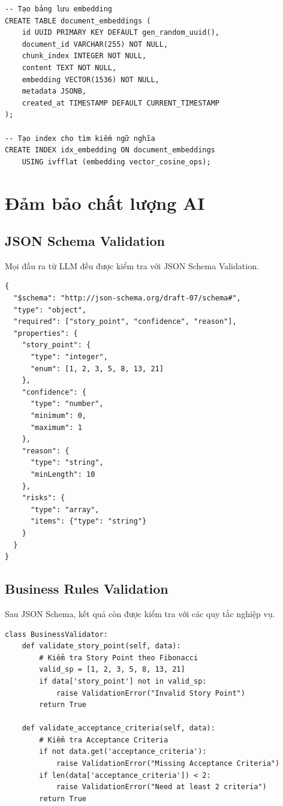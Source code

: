 \documentclass[12pt,a4paper]{report}
\begin{document}
\begin{verbatim}
-- Tạo bảng lưu embedding
CREATE TABLE document_embeddings (
    id UUID PRIMARY KEY DEFAULT gen_random_uuid(),
    document_id VARCHAR(255) NOT NULL,
    chunk_index INTEGER NOT NULL,
    content TEXT NOT NULL,
    embedding VECTOR(1536) NOT NULL,
    metadata JSONB,
    created_at TIMESTAMP DEFAULT CURRENT_TIMESTAMP
);

-- Tạo index cho tìm kiếm ngữ nghĩa
CREATE INDEX idx_embedding ON document_embeddings
    USING ivfflat (embedding vector_cosine_ops);
\end{verbatim}

\section{Đảm bảo chất lượng AI}

\subsection{JSON Schema Validation}

Mọi đầu ra từ LLM đều được kiểm tra với JSON Schema Validation.

\begin{verbatim}
{
  "$schema": "http://json-schema.org/draft-07/schema#",
  "type": "object",
  "required": ["story_point", "confidence", "reason"],
  "properties": {
    "story_point": {
      "type": "integer",
      "enum": [1, 2, 3, 5, 8, 13, 21]
    },
    "confidence": {
      "type": "number",
      "minimum": 0,
      "maximum": 1
    },
    "reason": {
      "type": "string",
      "minLength": 10
    },
    "risks": {
      "type": "array",
      "items": {"type": "string"}
    }
  }
}
\end{verbatim}

\subsection{Business Rules Validation}

Sau JSON Schema, kết quả còn được kiểm tra với các quy tắc nghiệp vụ.

\begin{verbatim}
class BusinessValidator:
    def validate_story_point(self, data):
        # Kiểm tra Story Point theo Fibonacci
        valid_sp = [1, 2, 3, 5, 8, 13, 21]
        if data['story_point'] not in valid_sp:
            raise ValidationError("Invalid Story Point")
        return True

    def validate_acceptance_criteria(self, data):
        # Kiểm tra Acceptance Criteria
        if not data.get('acceptance_criteria'):
            raise ValidationError("Missing Acceptance Criteria")
        if len(data['acceptance_criteria']) < 2:
            raise ValidationError("Need at least 2 criteria")
        return True
\end{verbatim}
\end{document}
